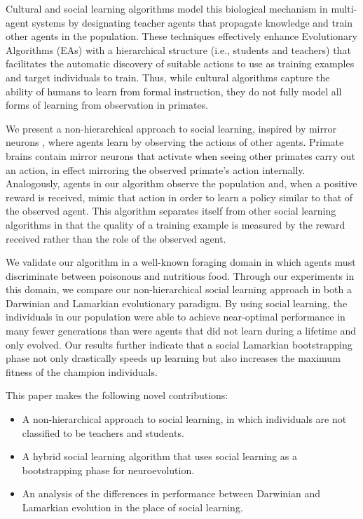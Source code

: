 \documentclass{acm_proc_article-sp}
\begin{document}
Cultural and social learning algorithms \cite{reynolds1994introduction} model this biological mechanism in multi-agent systems by designating teacher agents that propagate knowledge and train other agents in the population. These techniques effectively enhance Evolutionary Algorithms (EAs) with a hierarchical structure (i.e., students and teachers) that facilitates the automatic discovery of suitable actions to use as training examples and target individuals to train. Thus, while cultural algorithms capture the ability of humans to learn from formal instruction, they do not fully model all forms of learning from observation in primates.

We present a non-hierarchical approach to social learning, inspired by mirror neurons \cite{gallese-98}, where agents learn by observing the actions of other agents. Primate brains contain mirror neurons that activate when seeing other primates carry out an action, in effect mirroring the observed primate's action internally. Analogously, agents in our algorithm observe the population and, when a positive reward is received, mimic that action in order to learn a policy similar to that of the observed agent. This algorithm separates itself from other social learning algorithms in that the quality of a training example is measured by the reward received rather than the role of the observed agent.

We validate our algorithm in a well-known foraging domain in which agents must discriminate between poisonous and nutritious food. Through our experiments in this domain, we compare our non-hierarchical social learning approach in both a Darwinian and Lamarkian evolutionary paradigm. By using social learning, the individuals in our population were able to achieve near-optimal performance in many fewer generations than were agents that did not learn during a lifetime and only evolved. Our results further indicate that a social Lamarkian bootstrapping phase not only drastically speeds up learning but also increases the maximum fitness of the champion individuals.

This paper makes the following novel contributions:
 
\begin{itemize}
\item A non-hierarchical approach to social learning, in which individuals are not classified to be teachers and students.
\item A hybrid social learning algorithm that uses social learning as a bootstrapping phase for neuroevolution.
\item An analysis of the differences in performance between Darwinian and Lamarkian evolution in the place of social learning.
\end{itemize}
 
\end{document}
